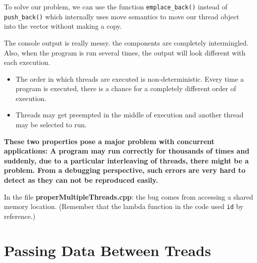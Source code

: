 \documentclass[11pt, a4paper]{article}
\begin{document}
To solve our problem, we can use the function \texttt{emplace\_back()} instead of \texttt{push\_back()} which internally uses move semantics to move our thread object into the vector without making a copy. 

The console output is really messy. the components are completely intermingled. Also, when the program is run several times, the output will look different with each execution.


\begin{itemize}
	\item The order in which threads are executed is non-deterministic. Every time a program is executed, there is a chance for a completely different order of execution.
	\item Threads may get preempted in the middle of execution and another thread may be selected to run.
\end{itemize}


\textbf{These two properties pose a major problem with concurrent applications: A program may run correctly for thousands of times and suddenly, due to a particular interleaving of threads, there might be a problem. From a debugging perspective, such errors are very hard to detect as they can not be reproduced easily.}




In the file \textbf{properMultipleThreads.cpp}: the bug comes from accessing a shared memory location. (Remember that the lambda function in the code used \texttt{id}  by reference.)







\section{Passing Data Between Treads}%
\label{sec:passing_data_between_treads}
\end{document}
